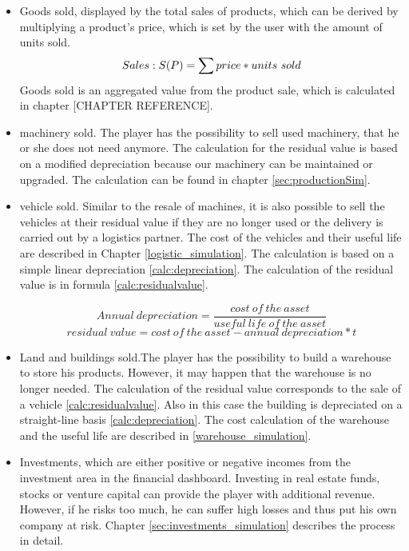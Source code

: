 \begin{itemize}
    \item Goods sold, displayed by the total sales of products, which can be derived by multiplying a product’s price, which is set by the user with the amount of units sold. %
    \begin{equation}
        Sales: S(P) = \sum price\index{Product} * units~sold
    \end{equation}
    Goods sold is an aggregated value from the product sale, which is calculated in chapter [CHAPTER REFERENCE].
    \item machinery sold. The player has the possibility to sell used machinery, that he or she does not need anymore. The calculation for the residual value is based on a modified depreciation because our machinery can be maintained or upgraded. The calculation can be found in chapter \ref{sec:productionSim}.
    \item vehicle sold. Similar to the resale of machines, it is also possible to sell the vehicles at their residual value if they are no longer used or the delivery is carried out by a logistics partner. The cost of the vehicles and their useful life are described in Chapter \ref{logistic_simulation}. The calculation is based on a simple linear depreciation \ref{calc:depreciation}. The calculation of the residual value is in formula \ref{calc:residualvalue}.
    
     \begin{equation}
     \label{calc:depreciation}
     Annual \ depreciation = {\dfrac{cost \ of \ the \ asset}{useful \ life \ of \ the \ asset}}
    \end{equation}
     \begin{equation}
     \label{calc:residualvalue}
     residual \ value = {{cost \ of \ the \ asset} - {annual \ depreciation * t }}    
     \end{equation}
     
    \item Land and buildings sold.The player has the possibility to build a warehouse to store his products. However, it may happen that the warehouse is no longer needed. The calculation of the residual value corresponds to the sale of a vehicle \ref{calc:residualvalue}. Also in this case the building is depreciated on a straight-line basis \ref{calc:depreciation}. The cost calculation of the warehouse and the useful life are described in \ref{warehouse_simulation}.
  
    \item Investments, which are either positive or negative incomes from the investment area in the financial dashboard. Investing in real estate funds, stocks or venture capital can provide the player with additional revenue. However, if he risks too much, he can suffer high losses and thus put his own company at risk. Chapter \ref{sec:investments_simulation} describes the process in detail.
\end{itemize}

